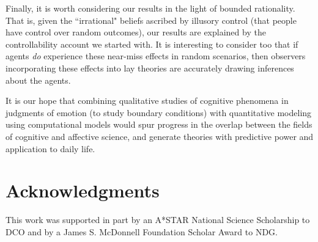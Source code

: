 \documentclass[10pt,letterpaper]{article}
\begin{document}
	Finally, it is worth considering our results in the light of bounded rationality. That is, given the ``irrational" beliefs ascribed by illusory control (that people have control over random outcomes), our results are explained by the controllability account we started with. It is interesting to consider too that if agents \textit{do} experience these near-miss effects in random scenarios, then observers incorporating these effects into lay theories are accurately drawing inferences about the agents.
	
	It is our hope that combining qualitative studies of cognitive phenomena in judgments of emotion (to study boundary conditions) with quantitative modeling using computational models would spur progress in the overlap between the fields of cognitive and affective science, and generate theories with predictive power and application to daily life.


\section{Acknowledgments}

This work was supported in part by an A*STAR National Science Scholarship to DCO and by a James S. McDonnell Foundation Scholar Award to NDG.




\setlength{\bibleftmargin}{.125in}
\setlength{\bibindent}{-\bibleftmargin}






	
\end{document}
